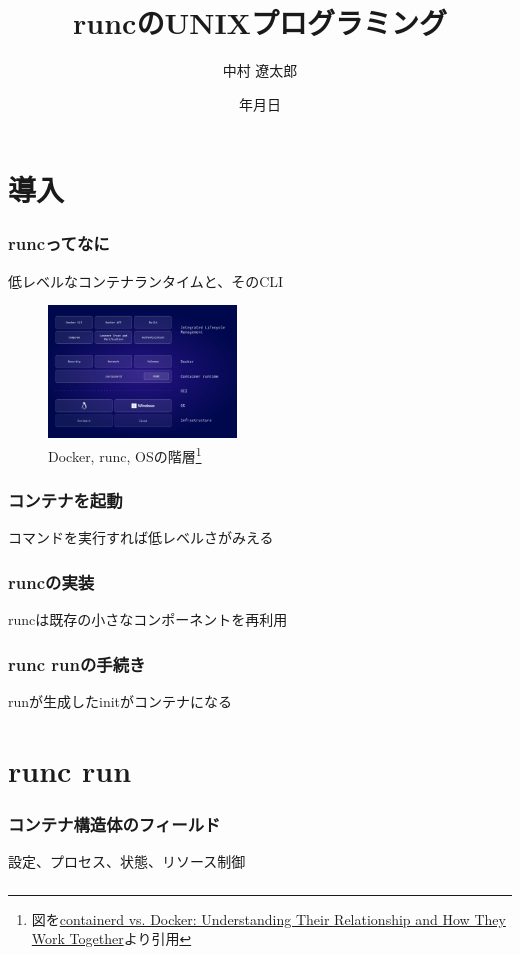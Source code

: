 \documentclass[unicode, 14pt, aspectratio=169]{beamer}
\date{\number\year 年\number\month 月\number\day 日}
\title{runcのUNIXプログラミング}
\author{中村 遼太郎}
\begin{document}
\begin{frame}
\titlepage
\end{frame}
\section{導入}
\begin{frame}[t]
  \frametitle{runcってなに}
  低レベルなコンテナランタイムと、そのCLI\cite{containerd-vs-docker}
  \begin{figure}
    \centering
    \includegraphics[width=5cm]{images/containerd-diagram-v1.png}
    \caption{Docker, runc, OSの階層\footnote{\scriptsize{図を\href{https://www.docker.com/blog/containerd-vs-docker}{containerd vs. Docker: Understanding Their Relationship and How They Work Together}より引用}}}
    \label{runc}
  \end{figure}
\end{frame}
\begin{frame}[t]
  \frametitle{コンテナを起動}
  コマンドを実行すれば低レベルさがみえる
\end{frame}
\begin{frame}[t]
  \frametitle{runcの実装}
  runcは既存の小さなコンポーネントを再利用
\end{frame}
\begin{frame}[t]
  \frametitle{runc runの手続き}
  runが生成したinitがコンテナになる
\end{frame}
\section{runc run}
\begin{frame}[t]
  \frametitle{コンテナ構造体のフィールド}
  設定、プロセス、状態、リソース制御
\end{frame}
\begin{frame}[t]
  \frametitle{}
\end{frame}
\end{document}
